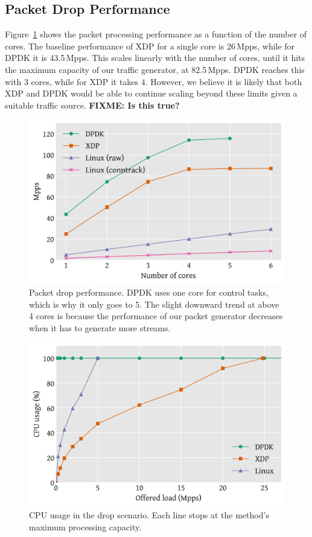 \documentclass[10pt,sigconf]{acmart}
\begin{document}
\subsection{Packet Drop Performance}
\label{sec:basel-pack-proc}
Figure~\ref{fig:drop-test} shows the packet processing performance as a function
of the number of cores. The baseline performance of XDP for a single core is
26\,Mpps, while for DPDK it is 43.5\,Mpps. This scales linearly with the number
of cores, until it hits the maximum capacity of our traffic generator, at
82.5\,Mpps. DPDK reaches this with 3 cores, while for XDP it takes 4. However,
we believe it is likely that both XDP and DPDK would be able to continue scaling
beyond these limits given a suitable traffic source. \textbf{FIXME: Is this
  true?}

\begin{figure}[t]
\centering
\includegraphics[width=\linewidth]{figures/drop-test.pdf}
\caption{\label{fig:drop-test} Packet drop performance. DPDK uses one core for
  control tasks, which is why it only goes to 5. The slight downward trend at
  above 4 cores is because the performance of our packet generator decreases
  when it has to generate more streams.}
\end{figure}

\begin{figure}[t]
\centering
\includegraphics[width=\linewidth]{figures/drop-cpu.pdf}
\caption{\label{fig:drop-cpu} CPU usage in the drop scenario. Each line stops at
the method's maximum processing capacity.}
\end{figure}
\end{document}
